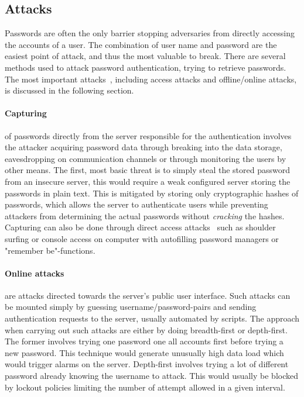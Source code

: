 \subsection{Attacks}\label{atck}
Passwords are often the only barrier stopping adversaries from directly accessing the accounts of a user. The combination of user name and password are the easiest point of attack, and thus the most valuable to break. There are several methods used to attack password authentication, trying to retrieve passwords. The most important attacks~\cite{nist-guide, strong-pws_florencio}, including access attacks and offline/online attacks, is discussed in the following section. 
\paragraph{Capturing} of passwords directly from the server responsible for the authentication involves the attacker acquiring password data through breaking into the data storage, eavesdropping on communication channels or through monitoring the users by other means. The first, most basic threat is to simply steal the stored password from an insecure server, this would require a weak configured server storing the passwords in plain text. This is mitigated by storing only cryptographic hashes of passwords, which allows the server to authenticate users while preventing attackers from determining the actual passwords without \emph{cracking} the hashes. Capturing can also be done through direct access attacks~\cite{guide-pws} such as shoulder surfing or console access on computer with autofilling password managers or "remember be"-functions.

\paragraph{Online attacks} are attacks directed towards the server's public user interface. Such attacks can be mounted simply by guessing username/password-pairs and sending authentication requests to the server, usually automated by scripts. The approach when carrying out such attacks are either by doing breadth-first or depth-first. The former involves trying one password one all accounts first before trying a new password. This technique would generate unusually high data load which would trigger alarms on the server. Depth-first involves trying a lot of different password already knowing the username to attack. This would usually be blocked by lockout policies limiting the number of attempt allowed in a given interval.

